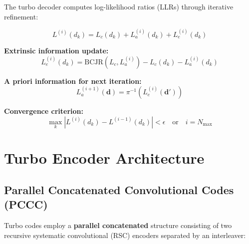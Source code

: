The turbo decoder computes log-likelihood ratios (LLRs) through iterative refinement:

\begin{equation}
L^{(i)}(d_k) = L_c(d_k) + L_a^{(i)}(d_k) + L_e^{(i)}(d_k)
\end{equation}

\textbf{Extrinsic information update:}
\begin{equation}
L_e^{(i)}(d_k) = \text{BCJR}(L_c, L_a^{(i)}) - L_c(d_k) - L_a^{(i)}(d_k)
\end{equation}

\textbf{A priori information for next iteration:}
\begin{equation}
L_a^{(i+1)}(\mathbf{d}) = \pi^{-1}\left(L_e^{(i)}(\mathbf{d}')\right)
\end{equation}

\textbf{Convergence criterion:}
\begin{equation}
\max_{k} \left| L^{(i)}(d_k) - L^{(i-1)}(d_k) \right| < \epsilon \quad \text{or} \quad i = N_{\max}
\end{equation}

\section{Turbo Encoder Architecture}

\subsection{Parallel Concatenated Convolutional Codes (PCCC)}

Turbo codes employ a \textbf{parallel concatenated} structure consisting of two recursive systematic convolutional (RSC) encoders separated by an interleaver:

